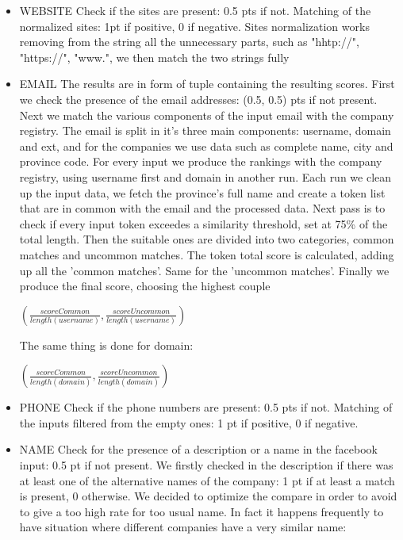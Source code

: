 \begin{itemize}
    \item WEBSITE
	Check if the sites are present: 0.5 pts if not.
	Matching of the normalized sites: 1pt if positive, 0 if negative.
	Sites normalization works removing from the string all the unnecessary parts, such as "hhtp://", "https://", "www.", we then match the two strings fully
	
    \item EMAIL
	The results are in form of tuple containing the resulting scores.
	First we check the presence of the email addresses: (0.5, 0.5) pts if not present.
	Next we match the various components of the input email with the company registry. The email is split in it's three main components: username, domain and ext, and for the companies we use data such as complete name, city and province code.
	For every input we produce the rankings with the company registry, using username first and domain in another run.
	Each run we clean up the input data, we fetch the province's full name and create a token list that are in common with the email and the processed data.
	Next pass is to check if every input token exceedes a similarity threshold, set at 75\% of the total length. Then the suitable ones are divided into two categories, common matches and uncommon matches.
	The token total score is calculated, adding up all the 'common matches'. Same for the 'uncommon matches'.
	Finally we produce the final score, choosing the highest couple
	
	
	
	$ \left(\frac{scoreCommon}{length(username)},\frac{scoreUncommon}{length(username)}\right)$
	
	
	

    The same thing is done for domain:
    
    
    $ \left(\frac{scoreCommon}{length(domain)},\frac{scoreUncommon}{length(domain)}\right)$
   
   
    \item PHONE
	Check if the phone numbers are present: 0.5 pts if not.
	Matching of the inputs filtered from the empty ones: 1 pt if positive, 0 if negative.
	

    \item NAME
	Check for the presence of a description or a name in the facebook input: 0.5 pt if not present.
	We firstly checked in the description if there was at least one of the alternative names of the company: 1 pt if at least a match is present, 0 otherwise.
	We decided to optimize the compare in order to avoid to give a too high rate for too usual name. In fact it happens frequently to have situation where different companies have a very similar name:
	

\end{itemize}
